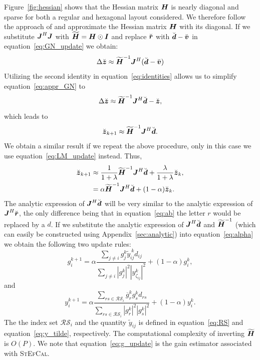 \documentclass[useAMS,usenatbib]{mn2e}
\newcommand{\bz}{\bmath{z}}
\newcommand{\br}{\bmath{r}}
\newcommand{\bd}{\bmath{d}}
\newcommand{\bv}{\bmath{v}}
\newcommand{\bJ}{\bmath{J}}
\newcommand{\bH}{\bmath{H}}
\newcommand{\bI}{\bmath{I}}
\newcommand{\conj}[1]{\overline{#1}}
\begin{document}
Figure~\ref{fig:hessian} shows that the Hessian matrix $\bH$ is nearly diagonal and sparse for both a regular and hexagonal layout considered. We therefore follow the approach of \citet{Smirnov2015} and approximate the Hessian matrix $\bH$ with its diagonal. If we substitute $\bJ^H\bJ$ with $\widetilde{\bH}=\bH\odot\bI$ and replace $\breve{\br}$ with $\breve{\bd} - \breve{\bv}$ in equation~\ref{eq:GN_update} we obtain:
\begin{equation}
\label{eq:appr_GN}
 \Delta \breve{\bz} \approx \widetilde{\bH}^{-1}\bJ^H(\breve{\bd}-\breve{\bv})
\end{equation}
Utilizing the second identity in equation~\ref{eq:identities} allows us to simplify equation~\ref{eq:appr_GN} to
\begin{equation}
  \Delta \breve{\bz} \approx \widetilde{\bH}^{-1}\bJ^H\breve{\bd}-\breve{\bz},
\end{equation}
which leads to
\begin{equation}
 \breve{\bz}_{k+1} \approx \widetilde{\bH}^{-1}\bJ^H\breve{\bd}.
\end{equation}
We obtain a similar result if we repeat the above procedure, only in this case we use equation~\ref{eq:LM_update} instead. Thus,
\begin{align}
\breve{\bz}_{k+1} &\approx \frac{1}{1+\lambda}\widetilde{\bH}^{-1}\bJ^H\breve{\bd} + \frac{\lambda}{1+\lambda} \breve{\bz}_k,\label{eq:lambda}\\
 &= \alpha \widetilde{\bH}^{-1}\bJ^H\breve{\bd} + (1-\alpha)\breve{\bz}_k. \label{eq:alpha}  
\end{align}
The analytic expression of $\bJ^H\breve{\bd}$ will be very similar to the analytic 
expression of $\bJ^H\breve{\br}$, the only difference being that in equation~\ref{eq:ab} the letter $r$ would be replaced by a $d$. If we substitute the analytic expression
of $\bJ^H\breve{\bd}$ and $\widetilde{\bH}^{-1}$ (which can easily be constructed using Appendix~\ref{sec:analytic}) into equation~\ref{eq:alpha} we obtain the following two update rules:
\begin{equation}
\label{eq:g_update}
g_{i}^{k+1} = \alpha \frac{\sum_{j\neq i} g_j^k \widetilde{y}_{ij}^{~\!\!k} d_{ij}}{\sum_{j\neq i} |g_j^k|^2|y_{\zeta_{ij}}^k|^2} + (1-\alpha) g_i^k, 
\end{equation}
and
\begin{equation}
\label{eq:y_update}
y_{i}^{k+1} = \alpha \frac{\sum_{rs \in \mathcal{RS}_i} \conj{g}_r^k g_s^k d_{rs}}{\sum_{rs \in \mathcal{RS}_i}|g_r^k|^2|g_s^k|^2} + (1-\alpha) y_i^k. 
\end{equation}
The the index set $\mathcal{RS}_i$ and the quantity $\widetilde{y}_{ij}$ is defined in equation~\ref{eq:RS} and equation~\ref{eq:y_tilde}, respectively. 
The computational complexity of inverting $\widetilde{\bH}$ is $O(P)$. We note that equation~\ref{eq:g_update} is the gain estimator associated with \textsc{StEfCal}.
\end{document}
